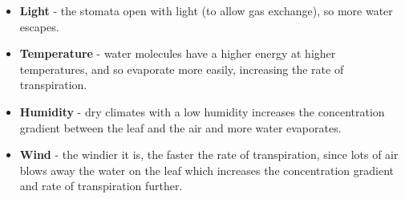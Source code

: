 \documentclass{article}
\begin{document}
\begin{itemize}

    \item {\bf Light} - the stomata open with light (to allow gas exchange), so
	more water escapes.

	\item {\bf Temperature} - water molecules have a higher energy at higher
	temperatures, and so evaporate more easily, increasing the rate of
	transpiration.

	\item {\bf Humidity} - dry climates with a low humidity increases the
	concentration gradient between the leaf and the air and more water
	evaporates.

	\item {\bf Wind} - the windier it is, the faster the rate of transpiration,
	since lots of air blows away the water on the leaf which increases the
	concentration gradient and rate of transpiration further.

\end{itemize}
\end{document}
